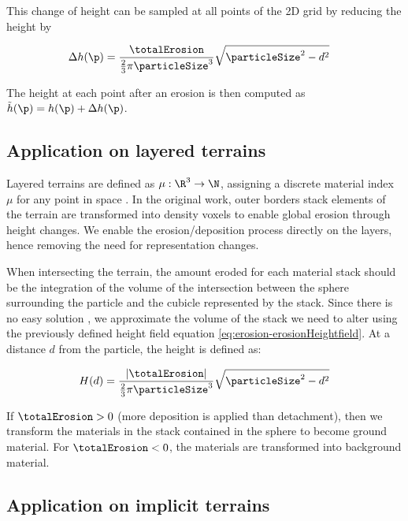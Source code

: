 This change of height can be sampled at all points of the 2D grid by reducing the height by 

\begin{align} 
    \label{eq:erosion-erosionHeightfield}
    \Delta h(\p) &= \frac{\totalErosion}{\frac{2}{3} \pi \particleSize^3} \sqrt{\particleSize^2 - d^2}
\end{align}

The height at each point after an erosion is then computed as $\Tilde{h}(\p) = h(\p) + \Delta h(\p)$.


\subsection{Application on layered terrains}
\label{sec:erosion-application_on_layers}

Layered terrains are defined as $\mu: \R^3 \to \N$, assigning a discrete material index $\mu$ for any point in space \cite{Benes2001, Peytavie2009b}. In the original work, outer borders stack elements of the terrain are transformed into density voxels to enable global erosion through height changes. We enable the erosion/deposition process directly on the layers, hence removing the need for representation changes.

When intersecting the terrain, the amount eroded for each material stack should be the integration of the volume of the intersection between the sphere surrounding the particle and the cubicle represented by the stack. Since there is no easy solution \cite{Jones2017}, we approximate the volume of the stack we need to alter using the previously defined height field equation \cref{eq:erosion-erosionHeightfield}.  
At a distance $d$ from the particle, the height is defined as:

\begin{align}
    \label{eq:erosion-erosionLayers}
    H(d) = \frac{|\totalErosion|}{\frac{2}{3} \pi \particleSize^3} \sqrt{\particleSize^2 - d^2}
\end{align}

If $\totalErosion > 0$ (more deposition is applied than detachment), then we transform the materials in the stack contained in the sphere to become ground material. For $\totalErosion < 0$, the materials are transformed into background material.

\subsection{Application on implicit terrains}
\label{sec:erosion-application_on_implicit}

